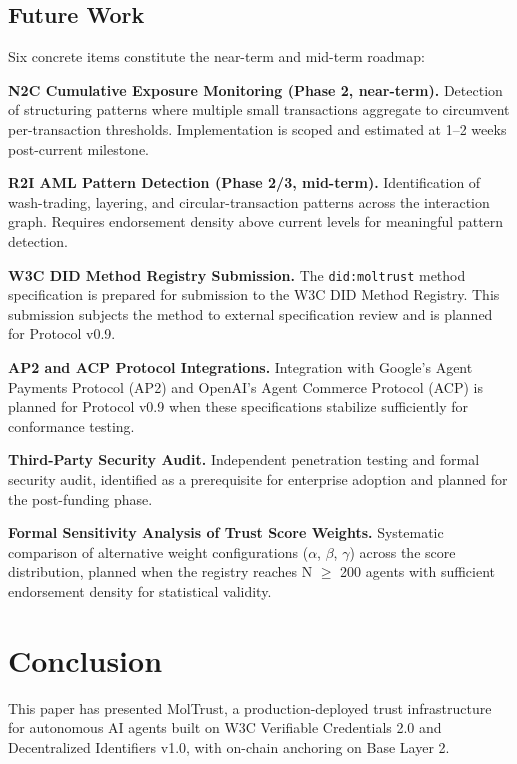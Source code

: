 \subsection{Future Work}

Six concrete items constitute the near-term and mid-term roadmap:


\textbf{N2C Cumulative Exposure Monitoring (Phase 2, near-term).} Detection of structuring patterns where multiple small transactions aggregate to circumvent per-transaction thresholds. Implementation is scoped and estimated at 1–2 weeks post-current milestone.


\textbf{R2I AML Pattern Detection (Phase 2/3, mid-term).} Identification of wash-trading, layering, and circular-transaction patterns across the interaction graph. Requires endorsement density above current levels for meaningful pattern detection.


\textbf{W3C DID Method Registry Submission.} The \texttt{did:moltrust} method specification is prepared for submission to the W3C DID Method Registry. This submission subjects the method to external specification review and is planned for Protocol v0.9.


\textbf{AP2 and ACP Protocol Integrations.} Integration with Google's Agent Payments Protocol (AP2) and OpenAI's Agent Commerce Protocol (ACP) is planned for Protocol v0.9 when these specifications stabilize sufficiently for conformance testing.


\textbf{Third-Party Security Audit.} Independent penetration testing and formal security audit, identified as a prerequisite for enterprise adoption and planned for the post-funding phase.


\textbf{Formal Sensitivity Analysis of Trust Score Weights.} Systematic comparison of alternative weight configurations ($\alpha$, $\beta$, $\gamma$) across the score distribution, planned when the registry reaches N $\geq$ 200 agents with sufficient endorsement density for statistical validity.



\section{Conclusion}

This paper has presented MolTrust, a production-deployed trust infrastructure for autonomous AI agents built on W3C Verifiable Credentials 2.0 and Decentralized Identifiers v1.0, with on-chain anchoring on Base Layer 2.



